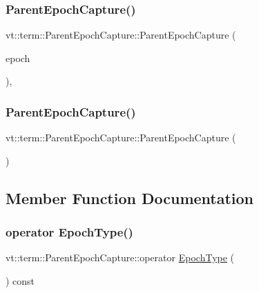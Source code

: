 \subsubsection{\texorpdfstring{Parent\+Epoch\+Capture()}{ParentEpochCapture()}\hspace{0.1cm}{\footnotesize\ttfamily [1/2]}}
{\footnotesize\ttfamily vt\+::term\+::\+Parent\+Epoch\+Capture\+::\+Parent\+Epoch\+Capture (\begin{DoxyParamCaption}\item[{\hyperlink{namespacevt_a81d11b28122d43bf9834577e4a06440f}{Epoch\+Type}}]{epoch }\end{DoxyParamCaption})\hspace{0.3cm}{\ttfamily [inline]}, {\ttfamily [explicit]}}

\mbox{\label{structvt_1_1term_1_1_parent_epoch_capture_a8a84ae05c8fb68499c6d5e52f2420221}} 
\subsubsection{\texorpdfstring{Parent\+Epoch\+Capture()}{ParentEpochCapture()}\hspace{0.1cm}{\footnotesize\ttfamily [2/2]}}
{\footnotesize\ttfamily vt\+::term\+::\+Parent\+Epoch\+Capture\+::\+Parent\+Epoch\+Capture (\begin{DoxyParamCaption}{ }\end{DoxyParamCaption})}



\subsection{Member Function Documentation}
\mbox{\label{structvt_1_1term_1_1_parent_epoch_capture_a2d719573a4e469b37374b94b5c990d0a}} 
\subsubsection{\texorpdfstring{operator Epoch\+Type()}{operator EpochType()}}
{\footnotesize\ttfamily vt\+::term\+::\+Parent\+Epoch\+Capture\+::operator \hyperlink{namespacevt_a81d11b28122d43bf9834577e4a06440f}{Epoch\+Type} (\begin{DoxyParamCaption}{ }\end{DoxyParamCaption}) const\hspace{0.3cm}{\ttfamily [inline]}}

